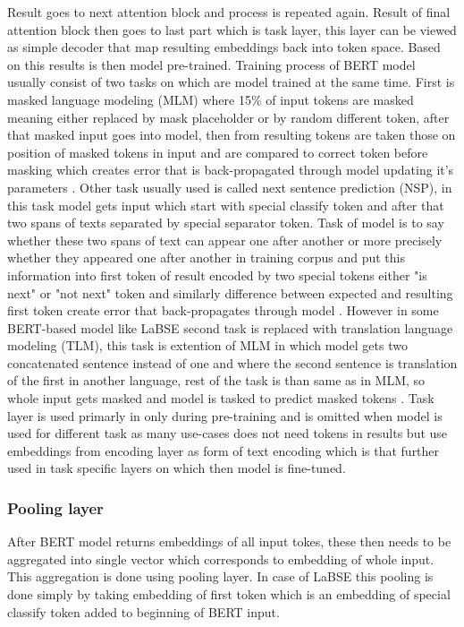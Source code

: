 Result goes to next attention block and process is repeated again. Result of final attention block then goes to last part which is task layer, this layer can be viewed as simple decoder that map resulting embeddings back into token space. Based on this results is then model pre-trained. Training process of BERT model usually consist of two tasks on which are model trained at the same time. First is masked language modeling (MLM) where 15\% of input tokens are masked meaning either replaced by mask placeholder or by random different token, after that masked input goes into model, then from resulting tokens are taken those on position of masked tokens in input and are compared to correct token before masking which creates error that is back-propagated through model updating it's parameters \cite{bert_pretr_1}. Other task usually used is called next sentence prediction (NSP), in this task model gets input which start with special classify token and after that two spans of texts separated by special separator token. Task of model is to say whether these two spans of text can appear one after another or more precisely whether they appeared one after another in training corpus and put this information into first token of result encoded by two special tokens either "is next" or "not next" token and similarly difference between expected and resulting first token create error that back-propagates through model \cite{bert_pretr_2}. However in some BERT-based model like LaBSE second task is replaced with translation language modeling (TLM), this task is extention of MLM in which model gets two concatenated sentence instead of one and where the second sentence is translation of the first in another language, rest of the task is than same as in MLM, so whole input gets masked and model is tasked to predict masked tokens \cite{bert_pretr_3}. Task layer is used primarly in only during pre-training and is omitted when model is used for different task as many use-cases does not need tokens in results but use embeddings from encoding layer as form of text encoding which is that further used in task specific layers on which then model is fine-tuned.

\subsubsection{Pooling layer}

After BERT model returns embeddings of all input tokes, these then needs to be aggregated into single vector which corresponds to embedding of whole input. This aggregation is done using pooling layer. In case of LaBSE this pooling is done simply by taking embedding of first token which is an embedding of special classify token added to beginning of BERT input.    

